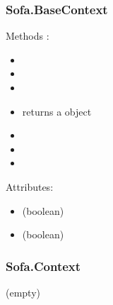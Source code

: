 \subsubsection{Sofa.BaseContext}
Methods :
\begin{itemize}
\item {} 
\item {} 
\item {} 
\item {} returns a  object
\item {} 
\item {}
\item {}
\end{itemize}
Attributes:
\begin{itemize}
\item {}  (boolean)
\item {}  (boolean)
\end{itemize}


\subsubsection{Sofa.Context}
(empty)
